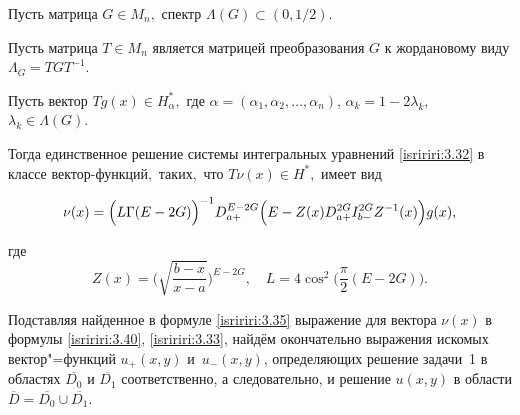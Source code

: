 \begin{theorem}

Пусть матрица $G \in M_n,$ спектр $\Lambda(G)\subset(0, 1/2).$

Пусть матрица $T\in M_n$ является матрицей преобразования $G$ к жордановому виду $\Lambda_{G}=TGT^{-1}.$ 

Пусть вектор $Tg(x)\in H^{*}_{\alpha},$ где $\alpha=(\alpha_1,\alpha_2,\ldots,\alpha_n)$, $\alpha_k = 1-2\lambda_k,$ $\lambda_k \in \Lambda(G).$ 

Тогда единственное решение системы интегральных уравнений \eqref{isririri:3.32} в классе вектор-функций$,$ таких$,$ что $T\nu(x) \in H^{*},$ имеет вид

\begin{equation}\label{isririri:3.35}

\nu(x)=\Bigl(L\Gamma(E-2G)\Bigr)^{-1}D^{E-2G}_{a+}\Bigl(E-Z(x)D^{2G}_{a+}I^{2G}_{b-}Z^{-1}(x)\Bigr)g(x),

\end{equation}

где $$

Z(x)=\biggl(\sqrt{\frac{b-x}{x-a}}\biggr)^{E-2G},\quad L=4\cos^{2}\bigl(\frac{\pi}{2}(E-2G)\bigr).$$

\end{theorem}



\smallskip





Подставляя найденное в формуле \eqref{isririri:3.35} выражение для вектора $\nu(x)$ в формулы \eqref{isririri:3.40}, \eqref{isririri:3.33}, найдём окончательно выражения искомых вектор"=функций $u_{+}(x,y)$ и~$u_{-}(x,y)$, определяющих решение задачи~1 в областях $\overline{D_0}$ и $\overline{D_1}$ соответственно, а следовательно, и решение $u(x,y)$ в области $\overline{D}=\overline{D_0}\cup\overline{D_1}$.









